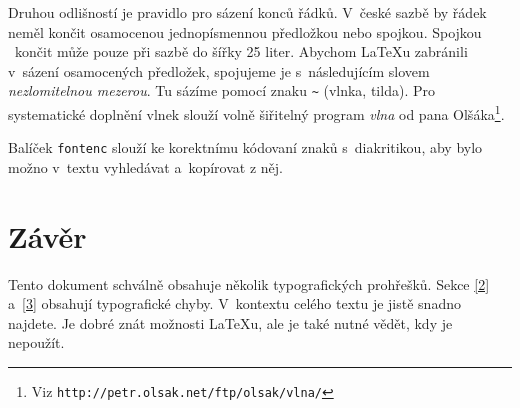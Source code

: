 \documentclass[twocolumn, 10pt, a4paper]{article}
\begin{document}
Druhou odlišností je pravidlo pro sázení konců řádků. V~české sazbě by řádek neměl končit osamocenou jednopísmennou předložkou nebo spojkou. Spojkou ~končit může pouze při sazbě do šířky 25 liter. Abychom \LaTeX u zabránili v~sázení osamocených předložek, spojujeme je s~následujícím slovem \textit{nezlomitelnou mezerou}. Tu sázíme pomocí znaku {\tt \~{}} (vlnka, tilda). Pro systematické doplnění vlnek slouží volně šiřitelný program \textit{vlna} od pana Olšáka\footnote{Viz \texttt{http://petr.olsak.net/ftp/olsak/vlna/}}.

Balíček \texttt{fontenc} slouží ke korektnímu kódovaní znaků s~diakritikou, aby bylo možno v~textu vyhledávat a~kopírovat z něj.

\section{Závěr}

Tento dokument schválně obsahuje několik typografických prohřešků. Sekce \ref{2} a~\ref{3} obsahují typografické chyby. V~kontextu celého textu je jistě snadno najdete. Je dobré znát možnosti \LaTeX u, ale je také nutné vědět, kdy je nepoužít.
\end{document}
